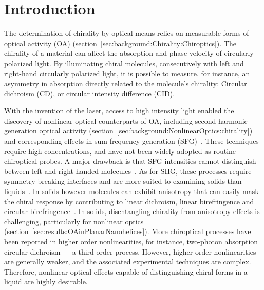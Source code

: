 \section{Introduction}

The determination of chirality by optical means relies on measurable forms of optical activity (OA) (section~\ref{sec:background:Chirality:Chiroptics}). The chirality of a material can affect the absorption and phase velocity of circularly polarized light. By illuminating chiral molecules, consecutively with left and right-hand circularly polarized light, it is possible to measure, for instance, an asymmetry in absorption directly related to the molecule's chirality: Circular dichroism (CD), or circular intensity difference (CID). 

With the invention of the laser, access to high intensity light enabled the discovery of nonlinear optical counterparts of OA, including second harmonic generation optical activity (section~\ref{sec:background:NonlinearOptics:chirality}) and corresponding effects in sum frequency generation (SFG)~\cite{Giordmaine1965, Belkin2000, Fischer2000}. These techniques require high concentrations, and have not been widely adopted as routine chiroptical probes. A major drawback is that SFG intensities cannot distinguish between left and right-handed molecules~\cite{Valev2013b}. 
As for SHG, these processes require symmetry-breaking interfaces and are more suited to examining solids than liquids~\cite{Fischer2005a, Collins2017}. In solids however molecules can exhibit anisotropy that can easily mask the chiral response by contributing to linear dichroism, linear birefringence and circular birefringence~\cite{Kuroda2001}.
In solids, disentangling chirality from anisotropy effects is challenging, particularly for nonlinear optics~\cite{Hooper2017} (section~\ref{sec:results:OAinPlanarNanohelices}). More chiroptical processes have been reported in higher order nonlinearities, for instance, two-photon absorption circular dichroism~\cite{Tinoco1975, DeBoni2008, Toro2010} – a third order process. However, higher order nonlinearities are generally weaker, and the associated experimental techniques are complex. Therefore, nonlinear optical effects capable of distinguishing chiral forms in a liquid are highly desirable. 

